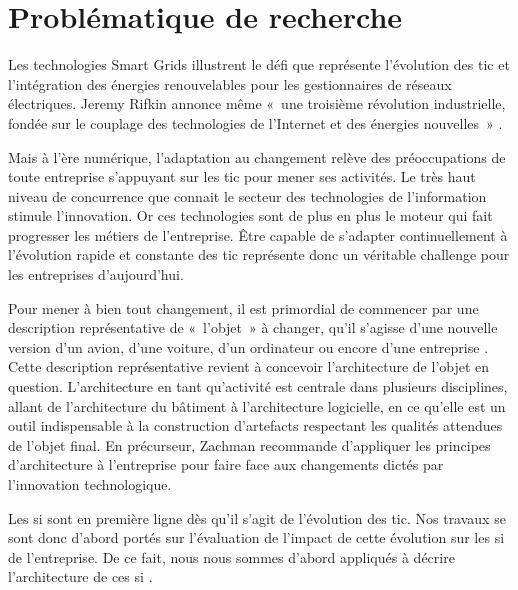  
\section{Problématique de recherche}


Les technologies Smart Grids illustrent le défi que représente l'évolution des 
\gls{tic} et l'intégration des énergies renouvelables pour les gestionnaires de 
réseaux électriques. Jeremy Rifkin annonce même «~une troisième révolution 
industrielle, fondée sur le couplage des technologies de l’Internet et des 
énergies nouvelles~» \cite{rifkin2012troisieme}. 

Mais à l'ère numérique, l'adaptation au changement relève des préoccupations de 
toute entreprise s'appuyant sur les \gls{tic} pour mener ses 
activités. Le très haut niveau de concurrence que connait le secteur des 
technologies de l'information stimule l'innovation. Or ces technologies sont de 
plus en plus le moteur qui fait progresser les  métiers de l'entreprise. Être 
capable de s'adapter continuellement à l'évolution rapide et 
constante des \gls{tic} représente donc un véritable challenge pour les 
entreprises 
d'aujourd'hui.

Pour mener à bien tout changement, il est primordial de commencer par une 
description représentative de «~l'objet~» à changer, qu'il s'agisse d'une 
nouvelle version d'un avion, d'une voiture, d'un ordinateur ou encore d'une 
entreprise \cite{zachman1997enterprise}. Cette description représentative 
revient à concevoir l'architecture de l'objet en question. L'architecture en 
tant qu'activité est centrale dans plusieurs disciplines, allant de 
l'architecture du bâtiment à l'architecture logicielle, en ce qu'elle est un 
outil indispensable à la construction d'artefacts respectant les qualités 
attendues de l'objet final. En précurseur, Zachman \cite{zachman1997enterprise} 
recommande d'appliquer les principes d'architecture à l'entreprise pour faire 
face aux changements dictés par l'innovation technologique.

Les \gls{si} sont en première ligne dès qu'il s'agit de l'évolution des 
\gls{tic}. Nos 
travaux se sont donc d'abord portés sur l'évaluation de l'impact de cette 
évolution sur les \gls{si} de l'entreprise. De ce fait, nous nous sommes d'abord 
appliqués à décrire l'architecture de ces \gls{si} \cite{seghiri2015simulation}. 

